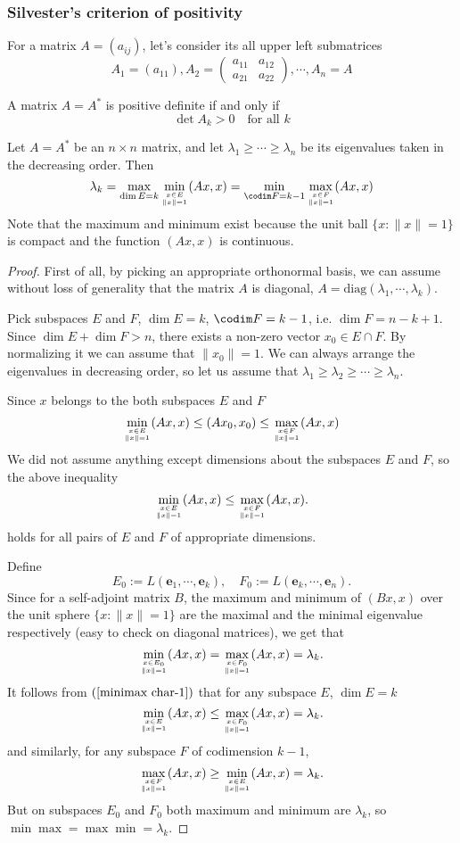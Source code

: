 \subsubsection{Silvester's criterion of positivity}
For a matrix $A=(a_{ij})$, let's consider its all upper left submatrices
\[A_1=(a_{11}),A_2=\begin{pmatrix}
a_{11}&a_{12}\\
a_{21}&a_{22}
\end{pmatrix},\cdots,A_n=A\]
\begin{theorem}\label{Silvester's Crit of Positivity}
A matrix $A=A^*$ is positive definite if and only if
\[\det A_k>0\quad\text{for all $k$}\]
\end{theorem}
\begin{theorem}\label{minimax char eigenvalue}
Let $A=A^*$ be an $n\times n$ matrix, and let $\lambda_1\geq\cdots\geq\lambda_n$ be its eigenvalues taken in the decreasing order. Then
\[\lambda_k=\max_{\dim E=k}\min_{x\in E\atop\|x\|=1}(Ax,x)=\min_{\codim F=k-1}\max_{x\in F\atop\|x\|=1}(Ax,x)\]
Note that the maximum and minimum exist because the unit ball $\{x:\|x\|=1\}$ is compact and the function $(Ax,x)$ is continuous.
\end{theorem}
\begin{proof}
First of all, by picking an appropriate orthonormal basis, we can assume without loss of generality that the matrix $A$ is diagonal, $A=\mathrm{diag}(\lambda_1,\cdots,\lambda_k)$.\par
Pick subspaces $E$ and $F$, $\dim E=k$, $\codim F=k-1$, i.e. $\dim F=n-k+1$. Since $\dim E+\dim F>n$, there exists a non-zero vector $x_0\in E\cap F$. By normalizing it we can assume that $\|x_0\|=1$. We can always arrange the eigenvalues in decreasing order, so let us assume that $\lambda_1\geq\lambda_2\geq\cdots\geq\lambda_n$.\par
Since $x$ belongs to the both subspaces $E$ and $F$
\[\min_{x\in E\atop\|x\|=1}(Ax,x)\leq(Ax_0,x_0)\leq\max_{x\in F\atop\|x\|=1}(Ax,x)\]
We did not assume anything except dimensions about the subspaces $E$ and $F$, so the above inequality
\begin{align}\label{minimax char-1}
\min_{x\in E\atop\|x\|=1}(Ax,x)\leq\max_{x\in F\atop\|x\|=1}(Ax,x).
\end{align}
holds for all pairs of $E$ and $F$ of appropriate dimensions.\par
Define
\[E_0:=L(\bm{e}_1,\cdots,\bm{e}_k),\quad F_0:=L(\bm{e}_k,\cdots,\bm{e}_n).\]
Since for a self-adjoint matrix $B$, the maximum and minimum of $(Bx,x)$ over the unit sphere $\{x:\|x\|=1\}$ are the maximal and the minimal eigenvalue
respectively (easy to check on diagonal matrices), we get that
\[\min_{x\in E_0\atop\|x\|=1}(Ax,x)=\max_{x\in F_0\atop\|x\|=1}(Ax,x)=\lambda_k.\]
It follows from $(\ref{minimax char-1})$ that for any subspace $E$, $\dim E=k$
\[\min_{x\in E\atop\|x\|=1}(Ax,x)\leq\max_{x\in F_0\atop\|x\|=1}(Ax,x)=\lambda_k.\]
and similarly, for any subspace $F$ of codimension $k-1$,
\[\max_{x\in F\atop\|x\|=1}(Ax,x)\geq\min_{x\in E\atop\|x\|=1}(Ax,x)=\lambda_k.\]
But on subspaces $E_0$ and $F_0$ both maximum and minimum are $\lambda_k$, so
$\min\max=\max\min=\lambda_k$.
\end{proof}
